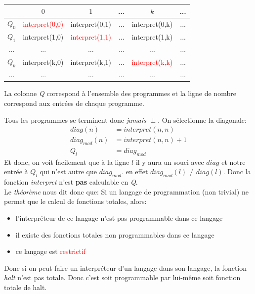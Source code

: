 \documentclass{report}
\begin{document}
\begin{center}
\begin{tabular}{|c|c|c|c|c|c|}
\hline
& $0$ & $1$ & ... & $k$& ...\\
\hline
$Q_0$ & \textcolor{red}{interpret(0,0)} & interpret(0,1) & ... & interpret(0,k) & ...\\
\hline
$Q_1$ & interpret(1,0) & \textcolor{red}{interpret(1,1)} & ... & interpret(1,k) & ...\\
\hline
... & ... & ... & ... & ... & ... \\
\hline
$Q_k$ & interpret(k,0) & interpret(k,1) & ... & \textcolor{red}{interpret(k,k)} & ...\\
\hline
... & ... & ... & ... & ... & ... \\
\hline
\end{tabular}
\end{center}
La colonne \textit{Q} correspond à l'ensemble des programmes et la ligne de nombre correspond aux entrées de chaque programme.

Tous les programmes se terminent donc \textit{jamais} $\perp$. On sélectionne la diagonale:
\begin{align}
diag(n) &= interpret(n,n)\\
diag_{mod}(n) &= interpret(n,n) + 1\\
Q_l &= diag_{mod}
\end{align}
Et donc, on voit facilement que à la ligne $l$ il y aura un souci avec $diag$ et notre entrée à $Q_l$ qui n'est autre que $diag_{mod}$. en effet $diag_{mod}(l) \neq diag(l)$. Donc la fonction \textit{interpret} n'est \textbf{pas} calculable en \textit{Q}.\\

Le \textit{théorème} nous dit donc que: Si un langage de programmation (non trivial) ne permet que le calcul de fonctions totales, alors: 
\begin{itemize}
\item l’interpréteur de ce langage n’est pas programmable dans ce langage 
\item il existe des fonctions totales non programmables dans ce langage
\item ce langage est \textcolor{red}{restrictif}
\end{itemize}

Donc si on peut faire un interpréteur d'un langage dans son langage, la fonction \textit{halt} n'est pas totale. Donc c'est soit programmable par lui-même soit fonction totale de halt.\\
\end{document}
